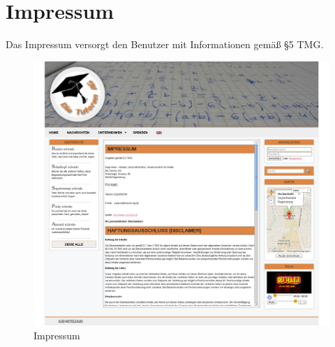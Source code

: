 
\section{Impressum}

Das Impressum versorgt den Benutzer mit Informationen gemäß §5 TMG.

\begin{figure}[!htbp]
\centering
\includegraphics[width=1\linewidth]{../Screenshots/de/Impressum}
\caption{Impressum}
\label{fig:Impressum}
\end{figure}
